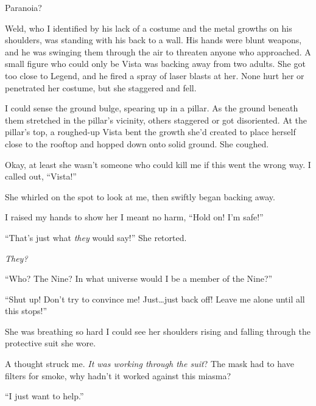 Paranoia?



Weld, who I identified by his lack of a costume and the metal growths on his shoulders, was standing with his back to a wall.  His hands were blunt weapons, and he was swinging them through the air to threaten anyone who approached.  A small figure who could only be Vista was backing away from two adults.  She got too close to Legend, and he fired a spray of laser blasts at her.  None hurt her or penetrated her costume, but she staggered and fell.



I could sense the ground bulge, spearing up in a pillar.  As the ground beneath them stretched in the pillar's vicinity, others staggered or got disoriented.  At the pillar's top, a roughed-up Vista bent the growth she'd created to place herself close to the rooftop and hopped down onto solid ground.  She coughed.



Okay, at least she wasn't someone who could kill me if this went the wrong way.  I called out, ``Vista!''



She whirled on the spot to look at me, then swiftly began backing away.



I raised my hands to show her I meant no harm, ``Hold on!  I'm safe!''



``That's just what \emph{they} would say!''  She retorted.



\emph{They?}



``Who?  The Nine?  In what universe would I be a member of the Nine?''



``Shut up!  Don't try to convince me!  Just\ldots just back off!  Leave me alone until all this stops!''



She was breathing so hard I could see her shoulders rising and falling through the protective suit she wore.



A thought struck me.\emph{  It was working through the suit}?  The mask had to have filters for smoke, why hadn't it worked against this miasma?



``I just want to help.''



